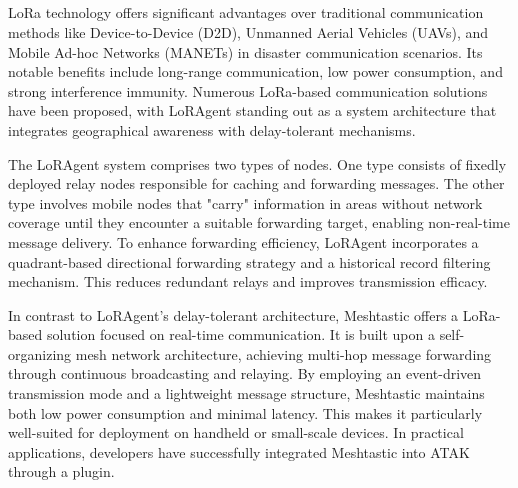 \subsection{}
LoRa technology offers significant advantages over traditional communication methods like Device-to-Device (D2D), Unmanned Aerial Vehicles (UAVs), and Mobile Ad-hoc Networks (MANETs) in disaster communication scenarios. Its notable benefits include long-range communication, low power consumption, and strong interference immunity. Numerous LoRa-based communication solutions have been proposed, with LoRAgent standing out as a system architecture that integrates geographical awareness with delay-tolerant mechanisms.

The LoRAgent system comprises two types of nodes. One type consists of fixedly deployed relay nodes responsible for caching and forwarding messages. The other type involves mobile nodes that "carry" information in areas without network coverage until they encounter a suitable forwarding target, enabling non-real-time message delivery. To enhance forwarding efficiency, LoRAgent incorporates a quadrant-based directional forwarding strategy and a historical record filtering mechanism. This reduces redundant relays and improves transmission efficacy.

In contrast to LoRAgent's delay-tolerant architecture, Meshtastic offers a LoRa-based solution focused on real-time communication. It is built upon a self-organizing mesh network architecture, achieving multi-hop message forwarding through continuous broadcasting and relaying. By employing an event-driven transmission mode and a lightweight message structure, Meshtastic maintains both low power consumption and minimal latency. This makes it particularly well-suited for deployment on handheld or small-scale devices. In practical applications, developers have successfully integrated Meshtastic into ATAK through a plugin.